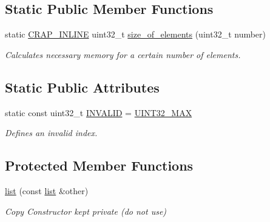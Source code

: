 \subsection*{Static Public Member Functions}
\begin{DoxyCompactItemize}
\item 
static \hyperlink{config__x86_8h_a5a40526b8d842e7ff731509998bb0f1c}{C\+R\+A\+P\+\_\+\+I\+N\+L\+I\+N\+E} uint32\+\_\+t \hyperlink{classcrap_1_1list_ad17fd8a0ca1d748b8c0ec9931ca1fb72}{size\+\_\+of\+\_\+elements} (uint32\+\_\+t number)
\begin{DoxyCompactList}\small\item\em Calculates necessary memory for a certain number of elements. \end{DoxyCompactList}\end{DoxyCompactItemize}
\subsection*{Static Public Attributes}
\begin{DoxyCompactItemize}
\item 
static const uint32\+\_\+t \hyperlink{classcrap_1_1list_af6ca677970fb2d6f6f22b82d89e9b183}{I\+N\+V\+A\+L\+I\+D} = \hyperlink{crap__types_8h_ab5eb23180f7cc12b7d6c04a8ec067fdd}{U\+I\+N\+T32\+\_\+\+M\+A\+X}
\begin{DoxyCompactList}\small\item\em Defines an invalid index. \end{DoxyCompactList}\end{DoxyCompactItemize}
\subsection*{Protected Member Functions}
\begin{DoxyCompactItemize}
\item 
\hyperlink{classcrap_1_1list_a2aca3019f7e393128c40987e33082ecd}{list} (const \hyperlink{classcrap_1_1list}{list} \&other)
\begin{DoxyCompactList}\small\item\em Copy Constructor kept private (do not use) \end{DoxyCompactList}\end{DoxyCompactItemize}
